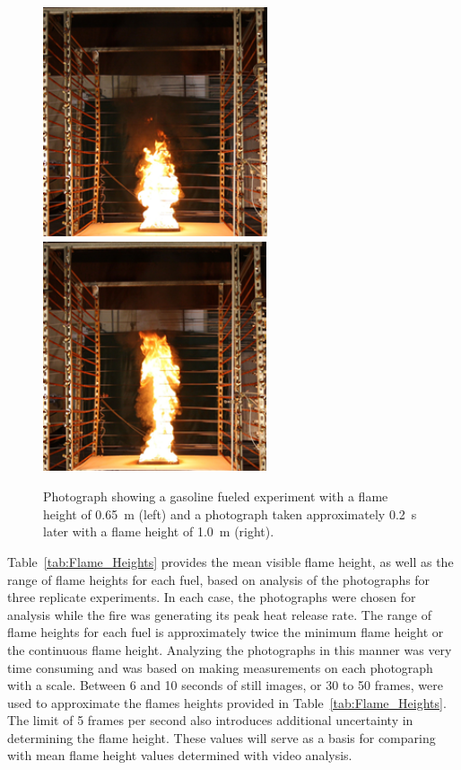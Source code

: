 \documentclass[twoside]{uocthesis}
\begin{document}
{\begin{figure}
  \includegraphics[width=2.6in]{../Figures/Gaso_0_65m}
  \includegraphics[width=2.6in]{../Figures/Gaso_1_0m} \\
  \caption[Photographs of the gasoline fire]{Photograph showing a gasoline fueled experiment with a flame height of 0.65~m (left) and a photograph taken approximately 0.2~s later with a flame height of 1.0~m (right).}
  \label{Gasoline_Photos}
\end{figure}


Table~\ref{tab:Flame_Heights} provides the mean visible flame height, as well as the range of flame heights for each fuel, based on analysis of the photographs for three replicate experiments.  In each case, the photographs were chosen for analysis while the fire was generating its peak heat release rate.  The range of flame heights for each fuel is approximately twice the minimum flame height or the continuous flame height. Analyzing the photographs in this manner was very time consuming and was based on making measurements on each photograph with a scale.  Between 6 and 10 seconds of still images, or 30 to 50 frames, were used to approximate the flames heights provided in Table~\ref{tab:Flame_Heights}.  The limit of 5 frames per second also introduces additional uncertainty in determining the flame height. These values will serve as a basis for comparing with mean flame height values determined with video analysis.

}
\end{document}
